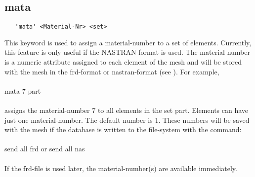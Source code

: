 \documentclass{article}
\begin{document}
\subsection{\label{mata}mata}
\begin{verbatim}
   'mata' <Material-Nr> <set> 
\end{verbatim}
This keyword is used to assign a material-number to a set of elements. Currently, this feature is only useful if the NASTRAN format is used. The material-number is a numeric attribute assigned to each element of the mesh and will be stored with the mesh in the frd-format or nastran-format (see ). For example,\\\\
mata 7 part\\\\
assigns the material-number 7 to all elements in the set part. Elements can have just one material-number. The default number is 1. These numbers will be saved with the mesh if the database is written to the file-system with the command:\\\\send all frd  or  send all nas\\\\If the frd-file is used later, the material-number(s) are available immediately.
\end{document}
